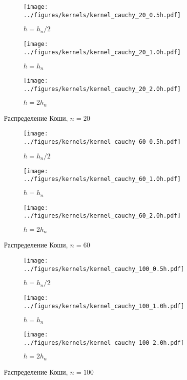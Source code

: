 \documentclass[12pt]{article}
\begin{document}
	\begin{figure}[H]
		\centering
		\begin{subfigure}[t]{.3\linewidth}
			\centering\texttt{[image: ../figures/kernels/kernel\_cauchy\_20\_0.5h.pdf]}
			\caption*{$h = h_n/2$}
		\end{subfigure}
		\begin{subfigure}[t]{.3\linewidth}
			\centering\texttt{[image: ../figures/kernels/kernel\_cauchy\_20\_1.0h.pdf]}
			\caption*{$h = h_n$}
		\end{subfigure}
		\begin{subfigure}[t]{.3\linewidth}
			\centering\texttt{[image: ../figures/kernels/kernel\_cauchy\_20\_2.0h.pdf]}
			\caption*{$h = 2h_n$}
		\end{subfigure}
		\caption{Распределение Коши, $n = 20$}
	\end{figure}
	\begin{figure}[H]
		\centering
		\begin{subfigure}[t]{.3\linewidth}
			\centering\texttt{[image: ../figures/kernels/kernel\_cauchy\_60\_0.5h.pdf]}
			\caption*{$h = h_n/2$}
		\end{subfigure}
		\begin{subfigure}[t]{.3\linewidth}
			\centering\texttt{[image: ../figures/kernels/kernel\_cauchy\_60\_1.0h.pdf]}
			\caption*{$h = h_n$}
		\end{subfigure}
		\begin{subfigure}[t]{.3\linewidth}
			\centering\texttt{[image: ../figures/kernels/kernel\_cauchy\_60\_2.0h.pdf]}
			\caption*{$h = 2h_n$}
		\end{subfigure}
		\caption{Распределение Коши, $n = 60$}
	\end{figure}
	\begin{figure}[H]
		\centering
		\begin{subfigure}[t]{.3\linewidth}
			\centering\texttt{[image: ../figures/kernels/kernel\_cauchy\_100\_0.5h.pdf]}
			\caption*{$h = h_n/2$}
		\end{subfigure}
		\begin{subfigure}[t]{.3\linewidth}
			\centering\texttt{[image: ../figures/kernels/kernel\_cauchy\_100\_1.0h.pdf]}
			\caption*{$h = h_n$}
		\end{subfigure}
		\begin{subfigure}[t]{.3\linewidth}
			\centering\texttt{[image: ../figures/kernels/kernel\_cauchy\_100\_2.0h.pdf]}
			\caption*{$h = 2h_n$}
		\end{subfigure}
		\caption{Распределение Коши, $n = 100$}
	\end{figure}
\end{document}
